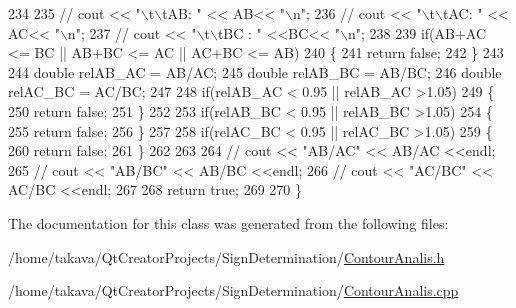 \begin{DoxyCode}
234 
235 \textcolor{comment}{//    cout << "\(\backslash\)t\(\backslash\)tAB: " << AB<< "\(\backslash\)n";}
236 \textcolor{comment}{//    cout << "\(\backslash\)t\(\backslash\)tAC: " << AC<< "\(\backslash\)n";}
237 \textcolor{comment}{//    cout << "\(\backslash\)t\(\backslash\)tBC : " <<BC<< "\(\backslash\)n";}
238 
239     \textcolor{keywordflow}{if}(AB+AC <= BC || AB+BC <= AC || AC+BC <= AB)
240     \{
241         \textcolor{keywordflow}{return} \textcolor{keyword}{false};
242     \}
243 
244     \textcolor{keywordtype}{double} relAB\_AC = AB/AC;
245     \textcolor{keywordtype}{double} relAB\_BC = AB/BC;
246     \textcolor{keywordtype}{double} relAC\_BC = AC/BC;
247 
248     \textcolor{keywordflow}{if}(relAB\_AC < 0.95 || relAB\_AC >1.05)
249     \{
250         \textcolor{keywordflow}{return} \textcolor{keyword}{false};
251     \}
252 
253     \textcolor{keywordflow}{if}(relAB\_BC < 0.95 || relAB\_BC >1.05)
254     \{
255         \textcolor{keywordflow}{return} \textcolor{keyword}{false};
256     \}
257 
258     \textcolor{keywordflow}{if}(relAC\_BC < 0.95 ||  relAC\_BC >1.05)
259     \{
260         \textcolor{keywordflow}{return} \textcolor{keyword}{false};
261     \}
262 
263 
264 \textcolor{comment}{//    cout << "AB/AC" << AB/AC <<endl;}
265 \textcolor{comment}{//    cout << "AB/BC" << AB/BC <<endl;}
266 \textcolor{comment}{//    cout << "AC/BC" << AC/BC <<endl;}
267 
268     \textcolor{keywordflow}{return} \textcolor{keyword}{true};
269 
270 \}
\end{DoxyCode}


The documentation for this class was generated from the following files\+:\begin{DoxyCompactItemize}
\item 
/home/takava/\+Qt\+Creator\+Projects/\+Sign\+Determination/\hyperlink{_contour_analis_8h}{Contour\+Analis.\+h}\item 
/home/takava/\+Qt\+Creator\+Projects/\+Sign\+Determination/\hyperlink{_contour_analis_8cpp}{Contour\+Analis.\+cpp}\end{DoxyCompactItemize}
